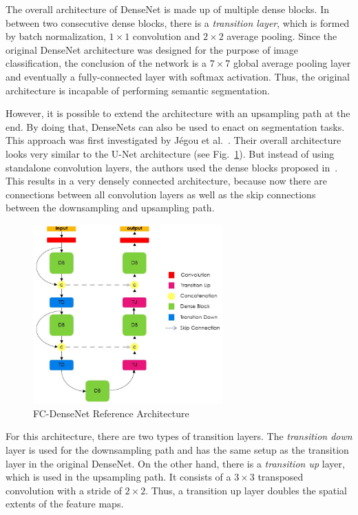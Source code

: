 The overall architecture of DenseNet is made up of multiple dense blocks. In between two consecutive dense blocks, there is a \emph{transition layer}, which is formed by batch normalization, $1\times 1$ convolution and $2\times 2$ average pooling. Since the original DenseNet architecture was designed for the purpose of image classification, the conclusion of the network is a $7\times 7$ global average pooling layer and eventually a fully-connected layer with softmax activation. Thus, the original architecture is incapable of performing semantic segmentation.

However, it is possible to extend the architecture with an upsampling path at the end. By doing that, DenseNets can also be used to enact on segmentation tasks. This approach was first investigated by Jégou et al.~\cite{denseseg17}. Their overall architecture looks very similar to the U-Net architecture (see Fig.~\ref{fig:densenet_segmentation}). But instead of using standalone convolution layers, the authors used the dense blocks proposed in~\cite{densenet17}. This results in a very densely connected architecture, because now there are connections between all convolution layers as well as the skip connections between the downsampling and upsampling path.

\begin{figure}[h]
    \centering
    \includegraphics[width=0.65\textwidth]{images/dense_segmentation_architecture}
    \caption[FC-DenseNet Reference Architecture]{FC-DenseNet Reference Architecture~\cite{denseseg17}}
    \label{fig:densenet_segmentation}
\end{figure}

For this architecture, there are two types of transition layers. The \emph{transition down} layer is used for the downsampling path and has the same setup as the transition layer in the original DenseNet. On the other hand, there is a \emph{transition up} layer, which is used in the upsampling path. It consists of a $3\times 3$ transposed convolution with a stride of $2\times 2$. Thus, a transition up layer doubles the spatial extents of the feature maps.

